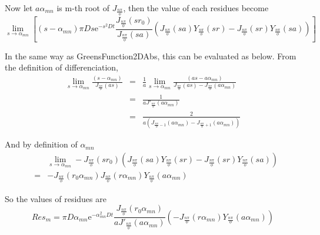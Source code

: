 \documentclass{article}
\begin{document}
Now let $a\alpha_{mn}$ is m-th root of $J_{\frac{n\pi}{\phi}}$,
then the value of each residues become
\begin{equation}
    \lim_{s\to\alpha_{mn}} \left[
       (s-\alpha_{mn})
       \pi Ds\mathrm{e}^{-s^2Dt}
       \frac{J_{\frac{n\pi}{\phi}}(sr_0)}{J_{\frac{n\pi}{\phi}}(sa)}
       \left(J_{\frac{n\pi}{\phi}}(sa)Y_{\frac{n\pi}{\phi}}(sr) -
        J_{\frac{n\pi}{\phi}}(sr)Y_{\frac{n\pi}{\phi}}(sa)\right)
       \right]
\end{equation}

In the same way as GreensFunction2DAbs, this can be evaluated as below.
From the definition of differenciation,
\begin{eqnarray}
    \lim_{s\to\alpha_{mn}}\frac{(s-\alpha_{mn})}{J_{\frac{n\pi}{\phi}}(as)}
    &=& \frac{1}{a} \lim_{s\to\alpha_{mn}} \frac{(as-a\alpha_{mn})}
        {J_{\frac{n\pi}{\phi}}(as) - J_{\frac{n\pi}{\phi}}(a\alpha_{mn})}\nonumber \\
    &=& \frac{1}{aJ'_{\frac{n\pi}{\phi}}(a\alpha_{mn})}\nonumber\\
    &=& \frac{2}{a(J_{\frac{n\pi}{\phi}-1}(a\alpha_{mn}) -
                   J_{\frac{n\pi}{\phi}+1}(a\alpha_{mn}))}\nonumber
\end{eqnarray}

And by definition of $\alpha_{mn}$
\begin{eqnarray}
    & & \lim_{s\to\alpha_{mn}}-J_{\frac{n\pi}{\phi}}(sr_0)
        (J_{\frac{n\pi}{\phi}}(sa)Y_{\frac{n\pi}{\phi}}(sr) -
         J_{\frac{n\pi}{\phi}}(sr)Y_{\frac{n\pi}{\phi}}(sa)) \nonumber \\
    &=& -J_{\frac{n\pi}{\phi}}(r_0\alpha_{mn})
         J_{\frac{n\pi}{\phi}}(r\alpha_{mn})Y_{\frac{n\pi}{\phi}}(a\alpha_{mn})
\end{eqnarray}

So the values of residues are
\begin{equation}\label{residue-values}
    Res_m = 
    \pi D\alpha_{mn}\mathrm{e}^{-\alpha_{mn}^2Dt}
    \frac{J_{\frac{n\pi}{\phi}}(r_0\alpha_{mn})}
         {aJ'_{\frac{n\pi}{\phi}}(a\alpha_{mn})}
       \left(-J_{\frac{n\pi}{\phi}}(r\alpha_{mn})
         Y_{\frac{n\pi}{\phi}}(a\alpha_{mn})\right)
\end{equation}
\end{document}
